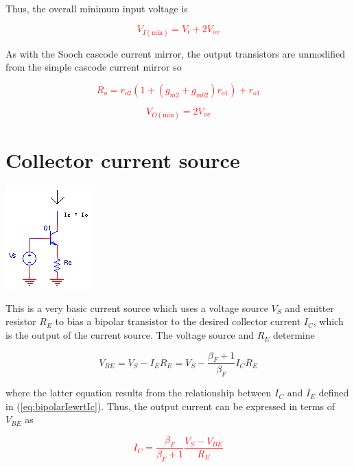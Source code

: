 Thus, the overall minimum input voltage is \autocite[273]{analysis-design-analog-ics}

\textcolor{red}{
\begin{equation}
V_{I(\text{min})} = V_{t} + 2V_{ov}
\end{equation}
}

As with the Sooch cascode current mirror, the output transistors are unmodified from the simple cascode current mirror so

\textcolor{red}{
\begin{equation}
R_{o} = r_{o2}(1 + (g_{m2} + g_{mb2})r_{o1}) + r_{o1}
\end{equation}
}

\textcolor{red}{
\begin{equation}
V_{O(\text{min})} = 2V_{ov}
\end{equation}
}

\section{Collector current source}
\begin{center}
	\includegraphics{schematics/collectorcurrentsource.PNG}
\end{center}
This is a very basic current source which uses a voltage source $V_{S}$ and emitter resistor $R_{E}$ to bias a bipolar transistor to the desired collector current $I_{C}$, which is the output of the current source.
The voltage source and $R_{E}$ determine

\begin{equation}
V_{BE} = V_{S} - I_{E}R_{E} = V_{S} - \frac{\beta_{F}+1}{\beta_{F}}I_{C}R_{E}
\end{equation}

where the latter equation results from the relationship between $I_{C}$ and $I_{E}$ defined in (\ref{eq:bipolarIewrtIc}).
Thus, the output current can be expressed in terms of $V_{BE}$ as

\textcolor{red}{
\begin{equation}
I_{C} = \frac{\beta_{F}}{\beta_{F}+1}\frac{V_{S}-V_{BE}}{R_{E}}
\label{eq:collector_currentsource_Ic_wrt_Vbe}
\end{equation}
}

